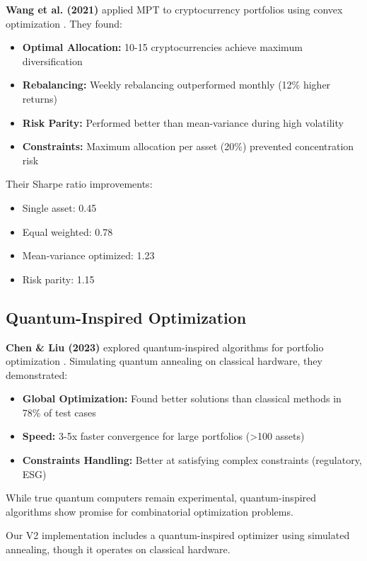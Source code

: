 \documentclass[conference]{IEEEtran}
\begin{document}
\textbf{Wang et al. (2021)} applied MPT to cryptocurrency portfolios using convex optimization \cite{wang2021portfolio}. They found:

\begin{itemize}
    \item \textbf{Optimal Allocation:} 10-15 cryptocurrencies achieve maximum diversification
    \item \textbf{Rebalancing:} Weekly rebalancing outperformed monthly (12\% higher returns)
    \item \textbf{Risk Parity:} Performed better than mean-variance during high volatility
    \item \textbf{Constraints:} Maximum allocation per asset (20\%) prevented concentration risk
\end{itemize}

Their Sharpe ratio improvements:
\begin{itemize}
    \item Single asset: 0.45
    \item Equal weighted: 0.78
    \item Mean-variance optimized: 1.23
    \item Risk parity: 1.15
\end{itemize}

\subsection{Quantum-Inspired Optimization}

\textbf{Chen \& Liu (2023)} explored quantum-inspired algorithms for portfolio optimization \cite{chen2023quantum}. Simulating quantum annealing on classical hardware, they demonstrated:

\begin{itemize}
    \item \textbf{Global Optimization:} Found better solutions than classical methods in 78\% of test cases
    \item \textbf{Speed:} 3-5x faster convergence for large portfolios (>100 assets)
    \item \textbf{Constraints Handling:} Better at satisfying complex constraints (regulatory, ESG)
\end{itemize}

While true quantum computers remain experimental, quantum-inspired algorithms show promise for combinatorial optimization problems.

Our V2 implementation includes a quantum-inspired optimizer using simulated annealing, though it operates on classical hardware.
\end{document}
